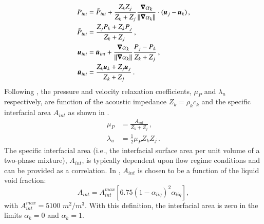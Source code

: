 \documentclass[preprint,10pt]{elsarticle}
\begin{document}
\begin{subequations}
\label{eq:int_variables_def}
\begin{align}
  \label{E-R:83}
  P_{int} &= \bar{P}_{int} + \frac{Z_{k}Z_{j}}{Z_{k}+Z_{j}} \frac{\boldsymbol\nabla \alpha_{k}}{|| \boldsymbol\nabla \alpha_{k} ||} \cdot (\boldsymbol u_{j}-\boldsymbol u_{k}) \,,
  \\
  \bar{P}_{int} &= \frac{Z_{j}P_{k}+Z_{k}P_{j}}{Z_{k}+Z_{j}} \,,
 \\
  \label{E-R:84}
  \boldsymbol u_{int} &= \bar{\boldsymbol u}_{int} +  \frac{\boldsymbol\nabla \alpha_{k}}{|| \boldsymbol\nabla \alpha_{k} ||} \frac{P_{j}-P_{k}}{Z_{k}+Z_{j}} \,,
  \\
  \bar{\boldsymbol u}_{int} &= \frac{Z_{k} \boldsymbol u_{k}+Z_{j}\boldsymbol u_{j}}{Z_{k}+Z_{j}} \,.
\end{align}
\end{subequations}
%
Following \cite{SEM}, the pressure and velocity relaxation coefficients, $\mu_P$  and $\lambda_u$ respectively, are function of the acoustic impedance $Z_k = \rho_k c_k$ and the specific interfacial area $A_{int}$ as shown in .
%
\begin{subequations}
\label{eq:relaxation_coeff}
\begin{align}
  \label{E-R:86}
  \mu_P &= \frac{A_{int}}{Z_{k}+Z_{j}}       \,,
  \\
  \label{E-R:85}
  \lambda_u &= \frac{1}{2} \mu_P Z_{k} Z_{j} \,.
\end{align}
\end{subequations}
%
The specific interfacial area (i.e., the interfacial surface area per unit
volume of a two-phase mixture), $A_{int}$, is typically dependent upon flow regime conditions and can be provided as a correlation. In \cite{SEM}, $A_{int}$ is chosen to be a function of the liquid void fraction:
%
\begin{equation}\label{eq:Aint-sect4}
A_{int} = A_{int}^{max} \left[ 6.75 \left(1-\alpha_{liq} \right)^2 \alpha_{liq} \right],
\end{equation}
% 
with $A_{int}^{max} = 5100$ $m^2 / m^3$. With this definition, the interfacial area is zero in the limits $\alpha_{k} = 0$ and $\alpha_{k} = 1$. 
\end{document}
